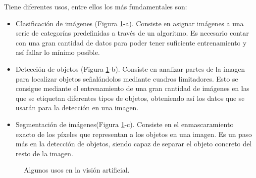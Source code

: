 Tiene diferentes usos, entre ellos los más fundamentales son:
\begin{itemize}
 \item Clasificación de imágenes (Figura \ref{fig:vision}-a). Consiste en asignar imágenes a una serie de categorías predefinidas a través de un algoritmo. Es necesario contar con una gran cantidad de datos para poder tener suficiente entrenamiento y así fallar lo mínimo posible.
 \item Detección de objetos (Figura \ref{fig:vision}-b). Consiste en analizar partes de la imagen para localizar objetos señalándolos mediante cuadros limitadores. Esto se consigue mediante el entrenamiento de una gran cantidad de imágenes en las que se etiquetan diferentes tipos de objetos, obteniendo así los datos que se usarán para la detección en una imagen.
  \item Segmentación de imágenes(Figura \ref{fig:vision}-c). Consiste en el enmascaramiento exacto de los píxeles que representan a los objetos en una imagen. Es un paso más en la detección de objetos, siendo capaz de separar el objeto concreto del resto de la imagen. 
\end{itemize}
\begin{figure}[h!]
  \begin{center}
    \hspace{8mm}
    \hspace{8mm}
  \end{center}
\caption{Algunos usos en la visión artificial.} \label{fig:vision}
\end{figure}

